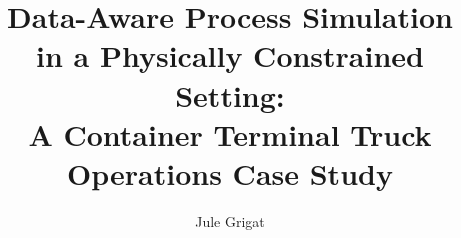 \title{\texorpdfstring{Data-Aware Process Simulation\\
in a Physically Constrained Setting:\\
A Container Terminal Truck Operations Case Study}{Data-Aware Process Simulation under Physical Constraints: A Container Terminal Truck Operations Case Study}}
\author{Jule Grigat}


